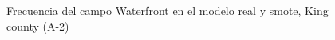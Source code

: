 \begin{figure}[H]
    \centering
    
    \caption{Frecuencia del campo Waterfront en el modelo real y smote, King county (A-2)}
    \label{frecuency-smote-waterfront}
\end{figure}